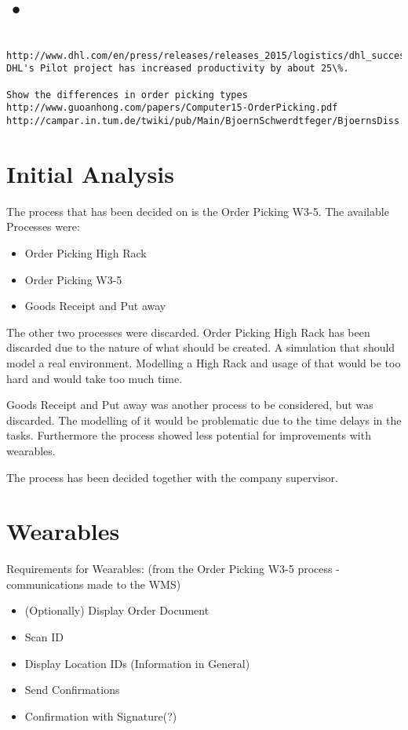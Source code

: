 \documentclass{report}
\begin{document}
\chapter{•}
\begin{verbatim}
 http://www.dhl.com/en/press/releases/releases_2015/logistics/dhl_successfully_tests_augmented_reality_application_in_warehouse.html
DHL's Pilot project has increased productivity by about 25\%.

Show the differences in order picking types
http://www.guoanhong.com/papers/Computer15-OrderPicking.pdf
http://campar.in.tum.de/twiki/pub/Main/BjoernSchwerdtfeger/BjoernsDiss.pdf

\end{verbatim}

\chapter{Initial Analysis}
The process that has been decided on is the Order Picking W3-5. The available Processes were:

\begin{itemize}
	\item Order Picking High Rack
	\item Order Picking W3-5
	\item Goods Receipt and Put away
\end{itemize}

The other two processes were discarded. Order Picking High Rack has been discarded due to the nature of what should be created. A simulation that should model a real environment. Modelling a High Rack and usage of that would be too hard and would take too much time.

Goods Receipt and Put away was another process to be considered, but was discarded. The modelling of it would be problematic due to the time delays in the tasks. Furthermore the process showed less potential for improvements with wearables.

The process has been decided together with the company supervisor.

\chapter{Wearables}
Requirements for Wearables: (from the Order Picking W3-5 process - communications made to the WMS)
\begin{itemize}
	\item (Optionally) Display Order Document
	\item Scan ID
	\item Display Location IDs (Information in General)
	\item Send Confirmations
	\item Confirmation with Signature(?)
\end{itemize}
\end{document}
